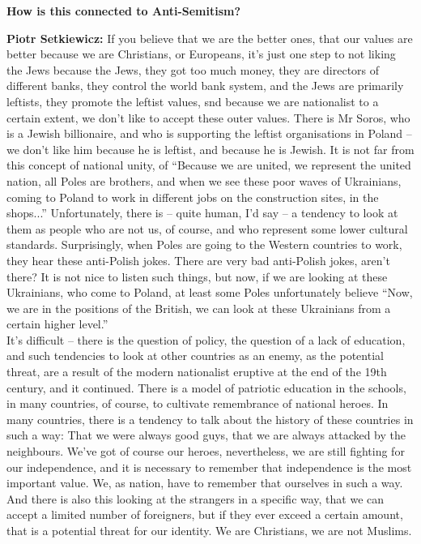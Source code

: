 \textbf{How is this connected to Anti-Semitism?} 

\textbf{Piotr Setkiewicz:} If you believe that we are the better ones, that our values are better because we are Christians, or Europeans, it’s just one step to not liking the Jews because the Jews, they got too much money, they are directors of different banks, they control the world bank system, and the Jews are primarily leftists, they promote the leftist values, snd because we are nationalist to a certain extent, we don’t like to accept these outer values. There is Mr Soros, who is a Jewish billionaire, and who is supporting the leftist organisations in Poland – we don’t like him because he is leftist, and because he is Jewish. It is not far from this concept of national unity, of ``Because we are united, we represent the united nation, all Poles are brothers, and when we see these poor waves of Ukrainians, coming to Poland to work in different jobs on the construction sites, in the shops...'' Unfortunately, there is – quite human, I’d say – a tendency to look at them as people who are not us, of course, and who represent some lower cultural standards. Surprisingly, when Poles are going to the Western countries to work, they hear these anti-Polish jokes. There are very bad anti-Polish jokes, aren’t there? It is not nice to listen such things, but now, if we are looking at these Ukrainians, who come to Poland, at least some Poles unfortunately believe ``Now, we are in the positions of the British, we can look at these Ukrainians from a certain higher level.'' \\
It’s difficult – there is the question of policy, the question of a lack of education, and such tendencies to look at other countries as an enemy, as the potential threat, are a result of the modern nationalist eruptive at the end of the 19th century, and it continued. There is a model of patriotic education in the schools, in many countries, of course, to cultivate remembrance of national heroes. In many countries, there is a tendency to talk about the history of these countries in such a way: That we were always good guys, that we are always attacked by the neighbours. We’ve got of course our heroes, nevertheless, we are still fighting for our independence, and it is necessary to remember that independence is the most important value. We, as nation, have to remember that ourselves in such a way. And there is also this looking at the strangers in a specific way, that we can accept a limited number of foreigners, but if they ever exceed a certain amount, that is a potential threat for our identity. We are Christians, we are not Muslims.\\

